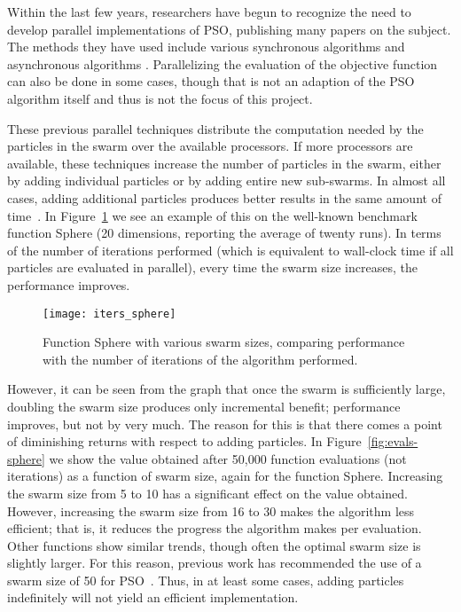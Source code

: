 \documentclass[ms]{byuprop}
\newcommand{\figref}[1]{Figure~\ref{fig:#1}}
\begin{document}
Within the last few years, researchers have begun to recognize the need to
develop parallel implementations of PSO, publishing many papers on the subject.
The methods they have used include various synchronous algorithms
\citep{chu-2006-intelligent-parallel-pso,jin-2005-pso-antenna-designs,%
parsopoulos-2004-parallel-vector-evaluated-pso,%
schutte-2004-parallel-global-optimization-with-pso} and asynchronous algorithms
\citep{mostaghim-2006-multi-objective-pso-on-grids,%
venter-2005-parallel-pso-asynchronous-evaluations}.  Parallelizing the
evaluation of the objective function can also be done in some cases, though
that is not an adaption of the PSO algorithm itself and thus is not the focus
of this project.

These previous parallel techniques distribute the computation needed by the
particles in the swarm over the available processors.  If more processors are
available, these techniques increase the number of particles in the swarm,
either by adding individual particles or by adding entire new sub-swarms.  In
almost all cases, adding additional particles produces better results in the
same amount of time~\citep{mcnabb-2009-large-particle-swarms}.  In
\figref{iters-sphere} we see an example of this on the well-known benchmark
function Sphere (20 dimensions, reporting the average of twenty runs).  In
terms of the number of iterations performed (which is equivalent to wall-clock
time if all particles are evaluated in parallel), every time the swarm size
increases, the performance improves.

\begin{figure}
  \centering
  \texttt{[image: iters\_sphere]}
  \caption{Function Sphere with various swarm sizes, comparing performance with
  the number of iterations of the algorithm performed.}
  \label{fig:iters-sphere}
\end{figure}

However, it can be seen from the graph that once the swarm is sufficiently
large, doubling the swarm size produces only incremental benefit; performance
improves, but not by very much.  The reason for this is that there comes a
point of diminishing returns with respect to adding particles.  In
\figref{evals-sphere} we show the value obtained after 50,000 function
evaluations (not iterations) as a function of swarm size, again for the
function Sphere.  Increasing the swarm size from 5 to 10 has a significant
effect on the value obtained.  However, increasing the swarm size from 16 to 30
makes the algorithm less efficient; that is, it reduces the progress the
algorithm makes per evaluation.  Other functions show similar trends, though
often the optimal swarm size is slightly larger.  For this reason, previous
work has recommended the use of a swarm size of 50 for
PSO~\citep{bratton-2007-defining-a-standard-for-pso}.  Thus, in at least some
cases, adding particles indefinitely will not yield an efficient
implementation.
\end{document}
